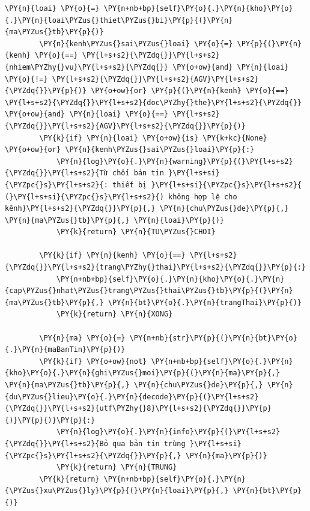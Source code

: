 \begin{Verbatim}[commandchars=\\\{\},frame=single,framerule=0.3pt,rulecolor=\color{black!40},fontsize=\footnotesize,breaklines=true]
        \PY{n}{loai} \PY{o}{=} \PY{n+nb+bp}{self}\PY{o}{.}\PY{n}{kho}\PY{o}{.}\PY{n}{loai\PYZus{}thiet\PYZus{}bi}\PY{p}{(}\PY{n}{ma\PYZus{}tb}\PY{p}{)}
        \PY{n}{kenh\PYZus{}sai\PYZus{}loai} \PY{o}{=} \PY{p}{(}\PY{n}{kenh} \PY{o}{==} \PY{l+s+s2}{\PYZdq{}}\PY{l+s+s2}{nhiem\PYZhy{}vu}\PY{l+s+s2}{\PYZdq{}} \PY{o+ow}{and} \PY{n}{loai} \PY{o}{!=} \PY{l+s+s2}{\PYZdq{}}\PY{l+s+s2}{AGV}\PY{l+s+s2}{\PYZdq{}}\PY{p}{)} \PY{o+ow}{or} \PY{p}{(}\PY{n}{kenh} \PY{o}{==} \PY{l+s+s2}{\PYZdq{}}\PY{l+s+s2}{doc\PYZhy{}the}\PY{l+s+s2}{\PYZdq{}} \PY{o+ow}{and} \PY{n}{loai} \PY{o}{==} \PY{l+s+s2}{\PYZdq{}}\PY{l+s+s2}{AGV}\PY{l+s+s2}{\PYZdq{}}\PY{p}{)}
        \PY{k}{if} \PY{n}{loai} \PY{o+ow}{is} \PY{k+kc}{None} \PY{o+ow}{or} \PY{n}{kenh\PYZus{}sai\PYZus{}loai}\PY{p}{:}
            \PY{n}{log}\PY{o}{.}\PY{n}{warning}\PY{p}{(}\PY{l+s+s2}{\PYZdq{}}\PY{l+s+s2}{Từ chối bản tin }\PY{l+s+si}{\PYZpc{}s}\PY{l+s+s2}{: thiết bị }\PY{l+s+si}{\PYZpc{}s}\PY{l+s+s2}{ (}\PY{l+s+si}{\PYZpc{}s}\PY{l+s+s2}{) không hợp lệ cho kênh}\PY{l+s+s2}{\PYZdq{}}\PY{p}{,} \PY{n}{chu\PYZus{}de}\PY{p}{,} \PY{n}{ma\PYZus{}tb}\PY{p}{,} \PY{n}{loai}\PY{p}{)}
            \PY{k}{return} \PY{n}{TU\PYZus{}CHOI}

        \PY{k}{if} \PY{n}{kenh} \PY{o}{==} \PY{l+s+s2}{\PYZdq{}}\PY{l+s+s2}{trang\PYZhy{}thai}\PY{l+s+s2}{\PYZdq{}}\PY{p}{:}
            \PY{n+nb+bp}{self}\PY{o}{.}\PY{n}{kho}\PY{o}{.}\PY{n}{cap\PYZus{}nhat\PYZus{}trang\PYZus{}thai\PYZus{}tb}\PY{p}{(}\PY{n}{ma\PYZus{}tb}\PY{p}{,} \PY{n}{bt}\PY{o}{.}\PY{n}{trangThai}\PY{p}{)}
            \PY{k}{return} \PY{n}{XONG}

        \PY{n}{ma} \PY{o}{=} \PY{n+nb}{str}\PY{p}{(}\PY{n}{bt}\PY{o}{.}\PY{n}{maBanTin}\PY{p}{)}
        \PY{k}{if} \PY{o+ow}{not} \PY{n+nb+bp}{self}\PY{o}{.}\PY{n}{kho}\PY{o}{.}\PY{n}{ghi\PYZus{}moi}\PY{p}{(}\PY{n}{ma}\PY{p}{,} \PY{n}{ma\PYZus{}tb}\PY{p}{,} \PY{n}{chu\PYZus{}de}\PY{p}{,} \PY{n}{du\PYZus{}lieu}\PY{o}{.}\PY{n}{decode}\PY{p}{(}\PY{l+s+s2}{\PYZdq{}}\PY{l+s+s2}{utf\PYZhy{}8}\PY{l+s+s2}{\PYZdq{}}\PY{p}{)}\PY{p}{)}\PY{p}{:}
            \PY{n}{log}\PY{o}{.}\PY{n}{info}\PY{p}{(}\PY{l+s+s2}{\PYZdq{}}\PY{l+s+s2}{Bỏ qua bản tin trùng }\PY{l+s+si}{\PYZpc{}s}\PY{l+s+s2}{\PYZdq{}}\PY{p}{,} \PY{n}{ma}\PY{p}{)}
            \PY{k}{return} \PY{n}{TRUNG}
        \PY{k}{return} \PY{n+nb+bp}{self}\PY{o}{.}\PY{n}{\PYZus{}xu\PYZus{}ly}\PY{p}{(}\PY{n}{loai}\PY{p}{,} \PY{n}{bt}\PY{p}{)}


\end{Verbatim}
